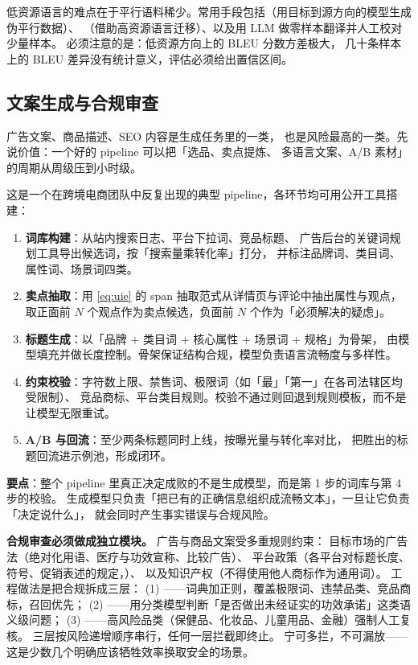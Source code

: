 低资源语言的难点在于平行语料稀少。常用手段包括（用目标到源方向的模型生成伪平行数据）、
（借助高资源语言迁移）、以及用 LLM 做零样本翻译并人工校对少量样本。
必须注意的是：低资源方向上的 BLEU 分数方差极大，
几十条样本上的 BLEU 差异没有统计意义，评估必须给出置信区间。

\subsection{文案生成与合规审查}

广告文案、商品描述、SEO 内容是生成任务里的一类，
也是风险最高的一类。先说价值：一个好的 pipeline 可以把「选品、卖点提炼、
多语言文案、A/B 素材」的周期从周级压到小时级。

\begin{casebox}
这是一个在跨境电商团队中反复出现的典型 pipeline，各环节均可用公开工具搭建：
\begin{enumerate}
  \item \textbf{词库构建}：从站内搜索日志、平台下拉词、竞品标题、
        广告后台的关键词规划工具导出候选词，按「搜索量乘转化率」打分，
        并标注品牌词、类目词、属性词、场景词四类。
  \item \textbf{卖点抽取}：用 \cref{eq:uie} 的 span 抽取范式从详情页与评论中抽出属性与观点，
        取正面前 $N$ 个观点作为卖点候选，负面前 $N$ 个作为「必须解决的疑虑」。
  \item \textbf{标题生成}：以「品牌 + 类目词 + 核心属性 + 场景词 + 规格」为骨架，
        由模型填充并做长度控制。骨架保证结构合规，模型负责语言流畅度与多样性。
  \item \textbf{约束校验}：字符数上限、禁售词、极限词（如「最」「第一」在各司法辖区均受限制）、
        竞品商标、平台类目规则。校验不通过则回退到规则模板，而不是让模型无限重试。
  \item \textbf{A/B 与回流}：至少两条标题同时上线，按曝光量与转化率对比，
        把胜出的标题回流进示例池，形成闭环。
\end{enumerate}
\textbf{要点}：整个 pipeline 里真正决定成败的不是生成模型，而是第 1 步的词库与第 4 步的校验。
生成模型只负责「把已有的正确信息组织成流畅文本」，一旦让它负责「决定说什么」，
就会同时产生事实错误与合规风险。
\end{casebox}

\textbf{合规审查必须做成独立模块。} 广告与商品文案受多重规则约束：
目标市场的广告法（绝对化用语、医疗与功效宣称、比较广告）、
平台政策（各平台对标题长度、符号、促销表述的规定，）、
以及知识产权（不得使用他人商标作为通用词）。
工程做法是把合规拆成三层：
(1) ——词典加正则，覆盖极限词、违禁品类、竞品商标，召回优先；
(2) ——用分类模型判断「是否做出未经证实的功效承诺」这类语义级问题；
(3) ——高风险品类（保健品、化妆品、儿童用品、金融）强制人工复核。
三层按风险递增顺序串行，任何一层拦截即终止。
宁可多拦，不可漏放——这是少数几个明确应该牺牲效率换取安全的场景。

